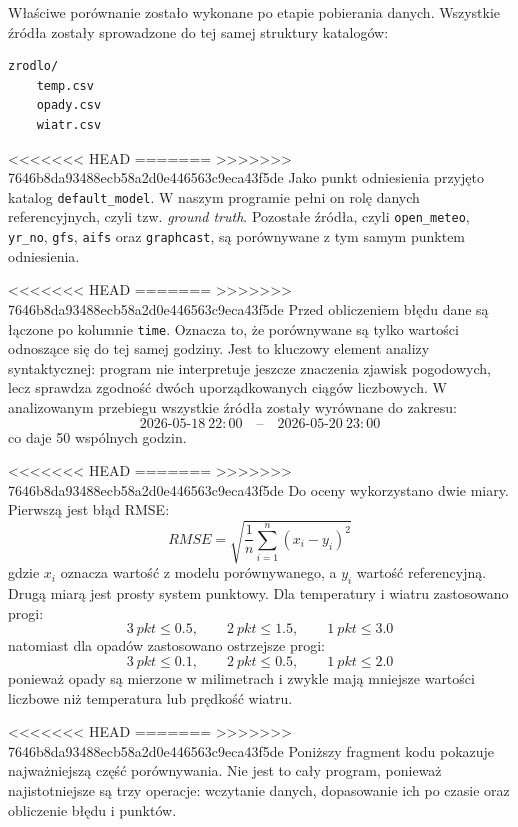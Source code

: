 \documentclass[a4paper,12pt]{article}
\begin{document}
Właściwe porównanie zostało wykonane po etapie pobierania danych. Wszystkie
źródła zostały sprowadzone do tej samej struktury katalogów:
\begin{verbatim}
zrodlo/
    temp.csv
    opady.csv
    wiatr.csv
\end{verbatim}

<<<<<<< HEAD
=======
\noindent
>>>>>>> 7646b8da93488ecb58a2d0e446563c9eca43f5de
Jako punkt odniesienia przyjęto katalog \texttt{default\_model}. W naszym
programie pełni on rolę danych referencyjnych, czyli tzw. \textit{ground truth}.
Pozostałe źródła, czyli \texttt{open\_meteo}, \texttt{yr\_no},
\texttt{gfs}, \texttt{aifs} oraz \texttt{graphcast}, są porównywane z tym
samym punktem odniesienia.

<<<<<<< HEAD
=======
\noindent
>>>>>>> 7646b8da93488ecb58a2d0e446563c9eca43f5de
Przed obliczeniem błędu dane są łączone po kolumnie \texttt{time}. Oznacza to,
że porównywane są tylko wartości odnoszące się do tej samej godziny. Jest to
kluczowy element analizy syntaktycznej: program nie interpretuje jeszcze
znaczenia zjawisk pogodowych, lecz sprawdza zgodność dwóch uporządkowanych
ciągów liczbowych. W analizowanym przebiegu wszystkie źródła zostały
wyrównane do zakresu:
\[
2026\text{-}05\text{-}18\ 22{:}00
\quad \text{--} \quad
2026\text{-}05\text{-}20\ 23{:}00
\]
co daje 50 wspólnych godzin.

<<<<<<< HEAD
=======
\noindent
>>>>>>> 7646b8da93488ecb58a2d0e446563c9eca43f5de
Do oceny wykorzystano dwie miary. Pierwszą jest błąd RMSE:
\[
RMSE = \sqrt{\frac{1}{n}\sum_{i=1}^{n}(x_i - y_i)^2}
\]
gdzie $x_i$ oznacza wartość z modelu porównywanego, a $y_i$ wartość
referencyjną. Drugą miarą jest prosty system punktowy. Dla temperatury i wiatru
zastosowano progi:
\[
3\ pkt \leq 0.5,\qquad
2\ pkt \leq 1.5,\qquad
1\ pkt \leq 3.0
\]
natomiast dla opadów zastosowano ostrzejsze progi:
\[
3\ pkt \leq 0.1,\qquad
2\ pkt \leq 0.5,\qquad
1\ pkt \leq 2.0
\]
ponieważ opady są mierzone w milimetrach i zwykle mają mniejsze wartości
liczbowe niż temperatura lub prędkość wiatru.

<<<<<<< HEAD
=======
\noindent
>>>>>>> 7646b8da93488ecb58a2d0e446563c9eca43f5de
Poniższy fragment kodu pokazuje najważniejszą część porównywania. Nie jest to
cały program, ponieważ najistotniejsze są trzy operacje: wczytanie danych,
dopasowanie ich po czasie oraz obliczenie błędu i punktów.
\end{document}
